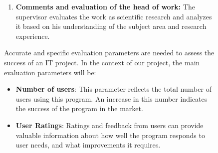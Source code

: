 \documentclass{article}
\begin{document}
\begin{figure}[!t]
\begin{minipage}{0.49\textwidth}
\begin{enumerate}
                \item \textbf{Comments and evaluation of the head of work:} The supervisor evaluates the work as scientific research and analyzes it based on his understanding of the subject area and research experience.
            \end{enumerate}
            Accurate and specific evaluation parameters are needed to assess the success of an IT project. In the context of our project, the main evaluation parameters will be:
            \begin{itemize}
                \item \textbf{Number of users}: This parameter reflects the total number of users using this program. An increase in this number indicates the success of the program in the market.
                \item \textbf{User Ratings}: Ratings and feedback from users can provide valuable information about how well the program responds to user needs, and what improvements it requires.
            \end{itemize}
        ~\\
        ~\\
        ~\\
        ~\\
        ~\\
        ~\\
        ~\\
        ~\\
        ~\\
        ~\\
        ~\\
        ~\\
        ~\\
        ~\\
        ~\\
        ~\\
        ~\\
        ~\\
        ~\\
        ~\\
        ~\\
        ~\\
        ~\\
        ~\\
        ~\\
        ~\\
        ~\\
        ~\\
        ~\\

\end{minipage}
\end{figure}
\end{document}
